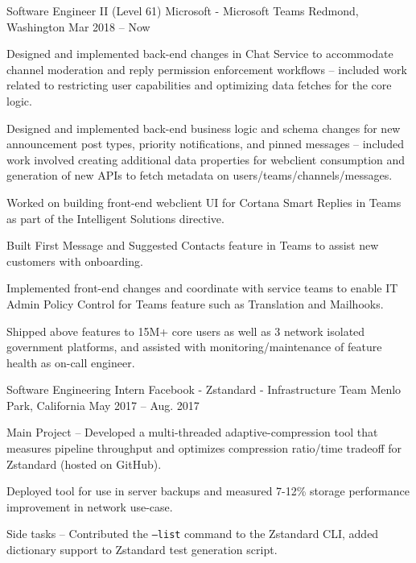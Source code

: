 \begin{cventries}
  \cventry
    {Software Engineer II (Level 61)}
    {Microsoft - Microsoft Teams}
    {Redmond, Washington}
    {Mar 2018 -- Now}
    {
      \begin{cvitems}
        \item {Designed and implemented back-end changes in Chat Service to accommodate channel moderation and reply permission enforcement workflows -- included work related to restricting user capabilities and optimizing data fetches for the core logic.}
        \item {Designed and implemented back-end business logic and schema changes for new announcement post types, priority notifications, and pinned messages -- included work involved creating additional data properties for webclient consumption and generation of new APIs to fetch metadata on users/teams/channels/messages.}
        \item {Worked on building front-end webclient UI for Cortana Smart Replies in Teams as part of the Intelligent Solutions directive.}
        \item {Built First Message and Suggested Contacts feature in Teams to assist new customers with onboarding.}
        \item {Implemented front-end changes and coordinate with service teams to enable IT Admin Policy Control for Teams feature such as Translation and Mailhooks.}
        \item {Shipped above features to 15M+ core users as well as 3 network isolated government platforms, and assisted with monitoring/maintenance of feature health as on-call engineer.}
      \end{cvitems}
    }
  \cventry
    {Software Engineering Intern}
    {Facebook - Zstandard - Infrastructure Team}
    {Menlo Park, California}
    {May 2017 -- Aug. 2017}
    {
      \begin{cvitems}
        \item {Main Project -- Developed a multi-threaded adaptive-compression tool that measures pipeline throughput and optimizes compression ratio/time tradeoff for Zstandard (hosted on GitHub).}
        \item {Deployed tool for use in server backups and measured 7-12\% storage performance improvement in network use-case.}
        \item {Side tasks -- Contributed the \texttt{--list} command to the Zstandard CLI, added dictionary support to Zstandard test generation script.}

\end{cvitems}}
\end{cventries}
